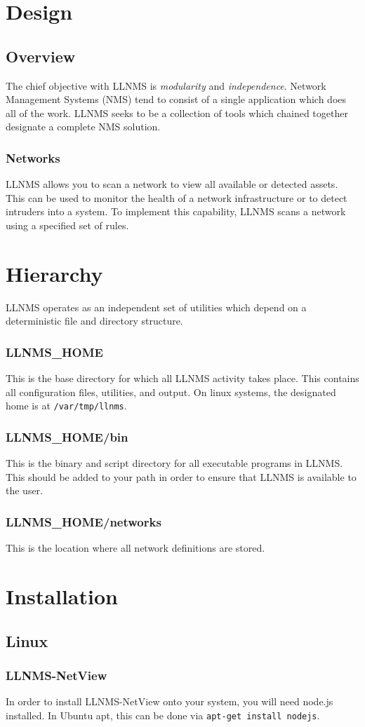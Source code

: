 \documentclass[12pt]{report}
\begin{document}
\section*{Design}

\subsection*{Overview}
The chief objective with LLNMS is \emph{modularity} and
\emph{independence}.  Network Management Systems (NMS) tend
to consist of a single application which does all of the work.  
LLNMS seeks to be a collection of tools which chained together 
designate a complete NMS solution. 


\subsubsection*{Networks}

LLNMS allows you to scan a network to view all available or detected assets.  This 
can be used to monitor the health of a network infrastructure or to detect intruders into
a system.  To implement this capability, LLNMS scans a network using a specified set of 
rules.  

\section*{Hierarchy}

LLNMS operates as an independent set of utilities which depend on 
a deterministic file and directory structure. 

\subsubsection*{LLNMS\_HOME}
This is the base directory for which all LLNMS activity takes place.  This
contains all configuration files, utilities, and output.  On linux systems, 
the designated home is at \texttt{/var/tmp/llnms}. 

\subsubsection*{LLNMS\_HOME/bin}
This is the binary and script directory for all executable programs in LLNMS.  This
should be added to your path in order to ensure that LLNMS is available to the user.

\subsubsection*{LLNMS\_HOME/networks}
This is the location where all network definitions are stored.

\section*{Installation}

\subsection*{Linux}

\subsubsection*{LLNMS-NetView}
In order to install LLNMS-NetView onto your system, you will need node.js installed. In Ubuntu apt, 
this can be done via \texttt{apt-get install nodejs}.
\end{document}
